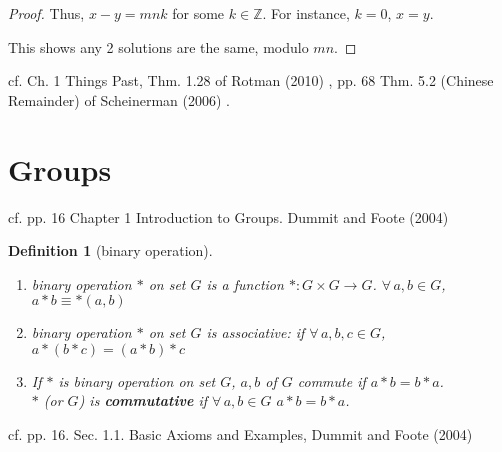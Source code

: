 \documentclass[10pt]{amsart}
\newtheorem{definition}{Definition}
\begin{document}
\begin{multicols*}{2}
\begin{proof}
Thus, $x-y = mn k$ for some $k\in \mathbb{Z}$.  For instance, $k=0$, $x=y$.  

This shows any 2 solutions are the same, modulo $mn$.  
\end{proof}


cf. Ch. 1 Things Past, Thm. 1.28 of Rotman (2010) \cite{JRotman2010}, pp. 68 Thm. 5.2 (Chinese Remainder) of Scheinerman (2006) \cite{Sche2006}.  




\section{Groups}
cf. pp. 16 Chapter 1 Introduction to Groups. Dummit and Foote (2004) \cite{DuFo2003}
\begin{definition}[binary operation]
	\begin{enumerate}
		\item binary operation $*$ on set $G$ is a function $*: G \times G \to G$.  $\forall \, a, b \in G$, $a* b \equiv *(a,b)$
		\item binary operation $*$ on set $G$ is \emph{associative}: if $\forall \, a, b, c \in G$, $a*(b*c) = (a*b) * c$ 
		\item If $*$ is binary operation on set $G$, $a,b $ of $G$ commute if $a*b = b*a$. \\
		$*$ (or $G$) is \textbf{commutative} if $\forall \, a, b \in G$ $a* b = b*a$.  
	\end{enumerate}
\end{definition}
cf. pp. 16. Sec. 1.1. Basic Axioms and Examples, Dummit and Foote (2004) \cite{DuFo2003} 


\end{multicols*}
\end{document}
